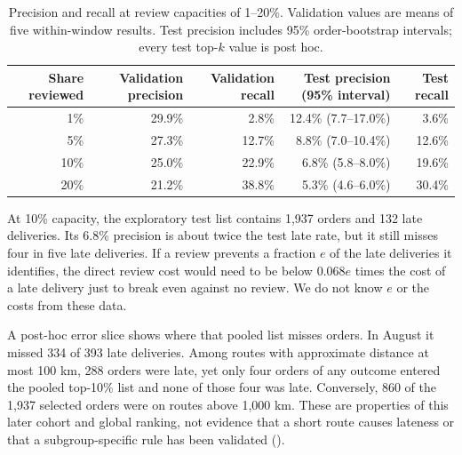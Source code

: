 \documentclass[12pt,a4paper]{article}
\begin{document}
\begin{table}[h]
\centering\small
\caption{Precision and recall at review capacities of 1--20\%. Validation values are means of five within-window results. Test precision includes 95\% order-bootstrap intervals; every test top-$k$ value is post hoc.}
\label{tab:topk}
\begin{tabular}{@{}rrrrr@{}}
\toprule
Share reviewed & Validation precision & Validation recall & Test precision (95\% interval) & Test recall \\
\midrule
1\% & 29.9\% & 2.8\% & 12.4\% (7.7--17.0\%) & 3.6\% \\
5\% & 27.3\% & 12.7\% & 8.8\% (7.0--10.4\%) & 12.6\% \\
10\% & 25.0\% & 22.9\% & 6.8\% (5.8--8.0\%) & 19.6\% \\
20\% & 21.2\% & 38.8\% & 5.3\% (4.6--6.0\%) & 30.4\% \\
\bottomrule
\end{tabular}
\end{table}

At 10\% capacity, the exploratory test list contains 1,937 orders and 132 late deliveries. Its 6.8\% precision is about twice the test late rate, but it still misses four in five late deliveries. If a review prevents a fraction $e$ of the late deliveries it identifies, the direct review cost would need to be below $0.068e$ times the cost of a late delivery just to break even against no review. We do not know $e$ or the costs from these data.

A post-hoc error slice shows where that pooled list misses orders. In August it missed 334 of 393 late deliveries. Among routes with approximate distance at most 100 km, 288 orders were late, yet only four orders of any outcome entered the pooled top-10\% list and none of those four was late. Conversely, 860 of the 1,937 selected orders were on routes above 1,000 km. These are properties of this later cohort and global ranking, not evidence that a short route causes lateness or that a subgroup-specific rule has been validated ().
\end{document}
